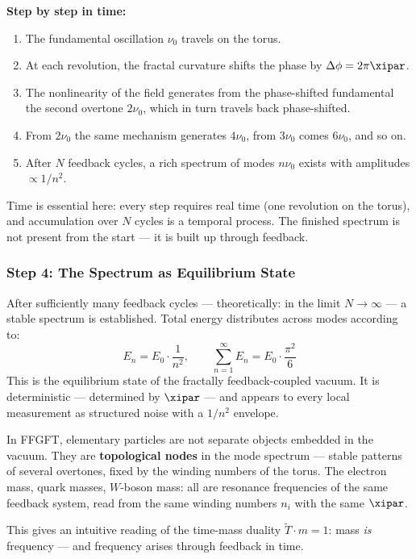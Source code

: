 \begin{keypoint}
\textbf{Step by step in time:}
\begin{enumerate}
    \item The fundamental oscillation $\nu_0$ travels on the torus.
    \item At each revolution, the fractal curvature shifts the phase by
    $\Delta\phi = 2\pi\xipar$.
    \item The nonlinearity of the field generates from the phase-shifted fundamental
    the second overtone $2\nu_0$, which in turn travels back phase-shifted.
    \item From $2\nu_0$ the same mechanism generates $4\nu_0$, from $3\nu_0$
    comes $6\nu_0$, and so on.
    \item After $N$ feedback cycles, a rich spectrum of modes $n\nu_0$ exists
    with amplitudes $\propto 1/n^2$.
\end{enumerate}
Time is essential here: every step requires real time (one revolution on the
torus), and accumulation over $N$ cycles is a temporal process. The finished
spectrum is not present from the start — it is built up through feedback.
\end{keypoint}

\subsubsection*{Step 4: The Spectrum as Equilibrium State}

After sufficiently many feedback cycles — theoretically: in the limit
$N \to \infty$ — a stable spectrum is established. Total energy distributes
across modes according to:
\begin{equation}
    E_n = E_0 \cdot \frac{1}{n^2}, \qquad \sum_{n=1}^{\infty} E_n = E_0 \cdot \frac{\pi^2}{6}
\end{equation}
This is the equilibrium state of the fractally feedback-coupled vacuum. It is
deterministic — determined by $\xipar$ — and appears to every local
measurement as structured noise with a $1/n^2$ envelope.

\begin{interpretation}
In FFGFT, elementary particles are not separate objects embedded in the vacuum.
They are \textbf{topological nodes} in the mode spectrum — stable patterns of
several overtones, fixed by the winding numbers of the torus. The electron mass,
quark masses, $W$-boson mass: all are resonance frequencies of the same feedback
system, read from the same winding numbers $n_i$ with the same $\xipar$.

This gives an intuitive reading of the time-mass duality $\tilde{T} \cdot m = 1$:
mass \emph{is} frequency — and frequency arises through feedback in time.
\end{interpretation}


